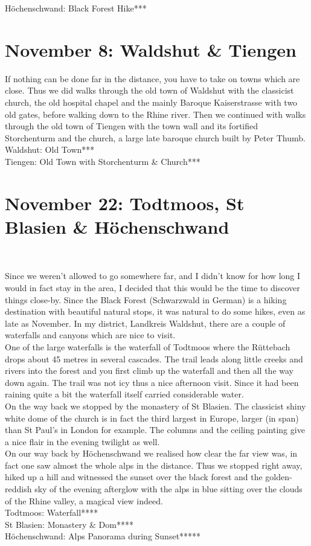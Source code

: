 H\"ochenschwand: Black Forest Hike***

\section{November 8: Waldshut \& Tiengen}
\label{2021WaldshutTiengen}

If nothing can be done far in the distance, you have to take on towns which are close. Thus we did walks through the old town of Waldshut with the classicist church, the old hospital chapel and the mainly Baroque Kaiserstrasse with two old gates, before walking down to the Rhine river. Then we continued with walks through the old town of Tiengen with the town wall and its fortified Storchenturm and the church, a large late baroque church built by Peter Thumb.\\

Waldshut: Old Town***\\
Tiengen: Old Town with Storchenturm \& Church***\\

\section{November 22: Todtmoos, St Blasien \& H\"ochenschwand}\
\label{2021:Todtmoos}

Since we weren't allowed to go somewhere far, and I didn't know for how long I would in fact stay in the area, I decided that this would be the time to discover things close-by. Since the Black Forest (Schwarzwald in German) is a hiking destination with beautiful natural stops, it was natural to do some hikes, even as late as November. In my district, Landkreis Waldshut, there are a couple of waterfalls and canyons which are nice to visit. \\
One of the large waterfalls is the waterfall of Todtmoos where the R\"uttebach drops about 45 metres in several cascades. The trail leads along little creeks and rivers into the forest and you first climb up the waterfall and then all the way down again. The trail was not icy thus a nice afternoon visit. Since it had been raining quite a bit the waterfall itself carried considerable water. \\
On the way back we stopped by the monastery of St Blasien. The classicist shiny white dome of the church is in fact the third largest in Europe, larger (in span) than St Paul's in London for example. The columns and the ceiling painting give a nice flair in the evening twilight as well. \\
On our way back by H\"ochenschwand we realised how clear the far view was, in fact one saw almost the whole alps in the distance. Thus we stopped right away, hiked up a hill and witnessed the sunset over the black forest and the golden-reddish sky of the evening afterglow with the alps in blue sitting over the clouds of the Rhine valley, a magical view indeed.\\

Todtmoos: Waterfall****\\
St Blasien: Monastery \& Dom****\\
H\"ochenschwand: Alps Panorama during Sunset*****\\

